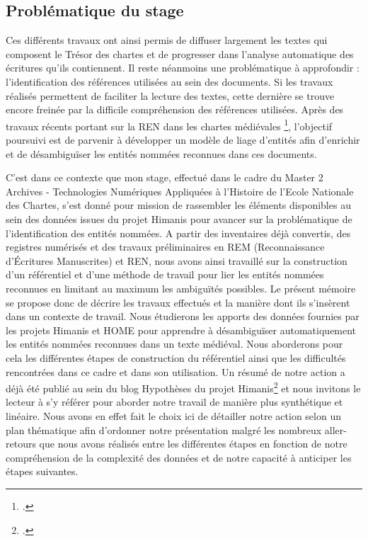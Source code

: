 \documentclass[a4paper,12pt,twoside]{book}
\begin{document}
	\subsection*{Problématique du stage}
	
	Ces différents travaux ont ainsi permis de diffuser largement les textes qui composent le Trésor des chartes et de progresser dans l'analyse automatique des écritures qu'ils contiennent. Il reste néanmoins une problématique à approfondir : l'identification des références utilisées au sein des documents. Si les travaux réalisés permettent de faciliter la lecture des textes, cette dernière se trouve encore freinée par la difficile compréhension des références utilisées. Après des travaux récents portant sur la REN dans les chartes médiévales \footcite{torres_aguilar_named_2021}, l'objectif poursuivi est de parvenir à développer un modèle de liage d'entités afin d'enrichir et de désambiguïser les entités nommées reconnues dans ces documents. 
	
	C'est dans ce contexte que mon stage, effectué dans le cadre du Master 2 Archives - Technologies Numériques Appliquées à l'Histoire de l'Ecole Nationale des Chartes, s'est donné pour mission de rassembler les éléments disponibles au sein des données issues du projet Himanis pour avancer sur la problématique de l'identification des entités nommées. A partir des inventaires déjà convertis, des registres numérisés et des travaux préliminaires en REM (Reconnaissance d'Écritures Manuscrites) et REN, nous avons ainsi travaillé sur la construction d'un référentiel et d'une méthode de travail pour lier les entités nommées reconnues en limitant au maximum les ambiguïtés possibles. Le présent mémoire se propose donc de décrire les travaux effectués et la manière dont ils s'insèrent dans un contexte de travail. Nous étudierons les apports des données fournies par les projets Himanis et HOME pour apprendre à désambiguïser automatiquement les entités nommées reconnues dans un texte médiéval. Nous aborderons pour cela les différentes étapes de construction du référentiel ainsi que les difficultés rencontrées dans ce cadre et dans son utilisation. Un résumé de notre action a déjà été publié au sein du blog Hypothèses du projet Himanis\footcite{reignier_lindex_2022} et nous invitons le lecteur à s'y référer pour aborder notre travail de manière plus synthétique et linéaire. Nous avons en effet fait le choix ici de détailler notre action selon un plan thématique afin d'ordonner notre présentation malgré les nombreux aller-retours que nous avons réalisés entre les différentes étapes en fonction de notre compréhension de la complexité des données et de notre capacité à anticiper les étapes suivantes.
	
\end{document}
